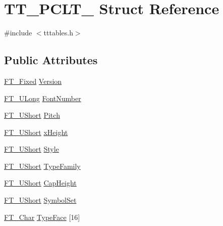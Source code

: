 \hypertarget{struct_t_t___p_c_l_t__}{}\section{T\+T\+\_\+\+P\+C\+L\+T\+\_\+ Struct Reference}
\label{struct_t_t___p_c_l_t__}


{\ttfamily \#include $<$tttables.\+h$>$}

\subsection*{Public Attributes}
\begin{DoxyCompactItemize}
\item 
\mbox{\hyperlink{fttypes_8h_a5f5a679cc09f758efdd0d1c5feed3c3d}{F\+T\+\_\+\+Fixed}} \mbox{\hyperlink{struct_t_t___p_c_l_t___a83429ca782a731b38d67e604809e278c}{Version}}
\item 
\mbox{\hyperlink{fttypes_8h_a4fac88bdba78eb76b505efa6e4fbf3f5}{F\+T\+\_\+\+U\+Long}} \mbox{\hyperlink{struct_t_t___p_c_l_t___a1465aa1ea82df2be913eb64498fe3d94}{Font\+Number}}
\item 
\mbox{\hyperlink{fttypes_8h_a937f6c17cf5ffd09086d8610c37b9f58}{F\+T\+\_\+\+U\+Short}} \mbox{\hyperlink{struct_t_t___p_c_l_t___ae8134f929d7a259c081fe28e9b5cf53d}{Pitch}}
\item 
\mbox{\hyperlink{fttypes_8h_a937f6c17cf5ffd09086d8610c37b9f58}{F\+T\+\_\+\+U\+Short}} \mbox{\hyperlink{struct_t_t___p_c_l_t___a4b2f3e6bf6508eacbff5e4eb16745872}{x\+Height}}
\item 
\mbox{\hyperlink{fttypes_8h_a937f6c17cf5ffd09086d8610c37b9f58}{F\+T\+\_\+\+U\+Short}} \mbox{\hyperlink{struct_t_t___p_c_l_t___a8e99588c1d255e28aa3c59600d5ae7bd}{Style}}
\item 
\mbox{\hyperlink{fttypes_8h_a937f6c17cf5ffd09086d8610c37b9f58}{F\+T\+\_\+\+U\+Short}} \mbox{\hyperlink{struct_t_t___p_c_l_t___a9bb9ac1b782e03002ecb99de08af7935}{Type\+Family}}
\item 
\mbox{\hyperlink{fttypes_8h_a937f6c17cf5ffd09086d8610c37b9f58}{F\+T\+\_\+\+U\+Short}} \mbox{\hyperlink{struct_t_t___p_c_l_t___a754d840e5bcf6011459de635aa38d728}{Cap\+Height}}
\item 
\mbox{\hyperlink{fttypes_8h_a937f6c17cf5ffd09086d8610c37b9f58}{F\+T\+\_\+\+U\+Short}} \mbox{\hyperlink{struct_t_t___p_c_l_t___ad4eeb575ecd624d4540275981e96a336}{Symbol\+Set}}
\item 
\mbox{\hyperlink{fttypes_8h_a0f851552b050883885f0a0855771f39d}{F\+T\+\_\+\+Char}} \mbox{\hyperlink{struct_t_t___p_c_l_t___a47c2c6b276f3ab2002fe03af41dad396}{Type\+Face}} \mbox{[}16\mbox{]}

\end{DoxyCompactItemize}
